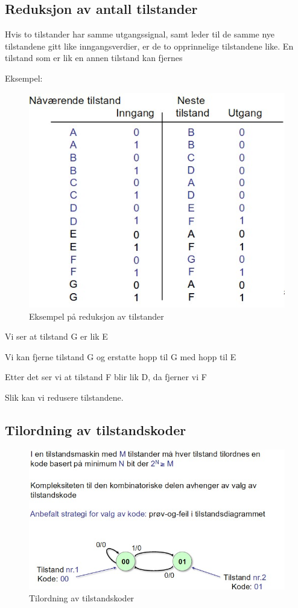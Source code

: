 \documentclass{article}
\begin{document}
	\subsection*{Reduksjon av antall tilstander}
	 Hvis to tilstander har samme utgangssignal, samt leder til de samme nye tilstandene gitt like inngangsverdier,
	 er de to opprinnelige tilstandene like. En tilstand som er lik en annen tilstand kan fjernes
	 
	 Eksempel:
	 \begin{figure}[H]
	 	\includegraphics[scale = 0.6]{red.jpg}
	 	\caption{Eksempel på reduksjon av tilstander}
	 \end{figure}
	 
	 Vi ser at tilstand G er lik E
	 
	 Vi kan fjerne tilstand G og erstatte hopp til G med hopp til E
	 
	 Etter det ser vi at tilstand F blir lik D, da fjerner vi F
	 
	 Slik kan vi redusere tilstandene.
	 
	 
	
	\subsection*{Tilordning av tilstandskoder}
	\begin{figure}[H]
		\includegraphics[scale = 0.6]{tilordning.jpg}
		\caption{Tilordning av tilstandskoder}
	\end{figure}
	
\end{document}
